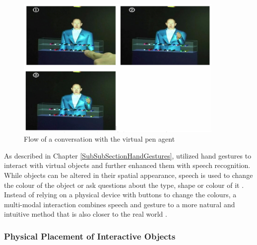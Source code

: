 \begin{figure}[h]
	\begin{center}
		\includegraphics[width=10cm]{03_Figures/05_LitReview/Uchino2008_SpeechPointing.png}
		\caption[Flow of a conversation with the virtual pen agent]{Flow of a conversation with the virtual pen agent \citep{Uchino2008}}
		\label{fig:speechrecignitionpen}
	\end{center}
\end{figure}
\newline
As described in Chapter \ref{SubSubSectionHandGestures}, \cite{Chun2015} utilized hand gestures to interact with virtual objects and further enhanced them with speech recognition. While objects can be altered in their spatial appearance, speech is used to change the colour of the object or ask questions about the type, shape or colour of it \citep{Chun2015}. Instead of relying on a physical device with buttons to change the colours, a multi-modal interaction combines speech and gesture to a more natural and intuitive method that is also closer to the real world \citep{Chun2015} .


\subsubsection{Physical Placement of Interactive Objects}

